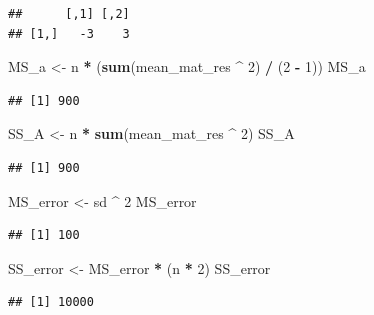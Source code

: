 \documentclass[
]{book}
\newenvironment{Shaded}{\begin{snugshade}}{\end{snugshade}}
\newcommand{\DecValTok}[1]{\textcolor[rgb]{0.00,0.00,0.81}{#1}}
\newcommand{\KeywordTok}[1]{\textcolor[rgb]{0.13,0.29,0.53}{\textbf{#1}}}
\newcommand{\NormalTok}[1]{#1}
\newcommand{\OperatorTok}[1]{\textcolor[rgb]{0.81,0.36,0.00}{\textbf{#1}}}
\newcommand{\StringTok}[1]{\textcolor[rgb]{0.31,0.60,0.02}{#1}}
\begin{document}
\begin{verbatim}
##      [,1] [,2]
## [1,]   -3    3
\end{verbatim}

\begin{Shaded}
\begin{Highlighting}[]
\NormalTok{MS_a <-}\StringTok{ }\NormalTok{n }\OperatorTok{*}\StringTok{ }\NormalTok{(}\KeywordTok{sum}\NormalTok{(mean_mat_res }\OperatorTok{^}\StringTok{ }\DecValTok{2}\NormalTok{) }\OperatorTok{/}\StringTok{ }\NormalTok{(}\DecValTok{2} \OperatorTok{-}\StringTok{ }\DecValTok{1}\NormalTok{))}
\NormalTok{MS_a}
\end{Highlighting}
\end{Shaded}

\begin{verbatim}
## [1] 900
\end{verbatim}

\begin{Shaded}
\begin{Highlighting}[]
\NormalTok{SS_A <-}\StringTok{ }\NormalTok{n }\OperatorTok{*}\StringTok{ }\KeywordTok{sum}\NormalTok{(mean_mat_res }\OperatorTok{^}\StringTok{ }\DecValTok{2}\NormalTok{)}
\NormalTok{SS_A}
\end{Highlighting}
\end{Shaded}

\begin{verbatim}
## [1] 900
\end{verbatim}

\begin{Shaded}
\begin{Highlighting}[]
\NormalTok{MS_error <-}\StringTok{ }\NormalTok{sd }\OperatorTok{^}\StringTok{ }\DecValTok{2}
\NormalTok{MS_error}
\end{Highlighting}
\end{Shaded}

\begin{verbatim}
## [1] 100
\end{verbatim}

\begin{Shaded}
\begin{Highlighting}[]
\NormalTok{SS_error <-}\StringTok{ }\NormalTok{MS_error }\OperatorTok{*}\StringTok{ }\NormalTok{(n }\OperatorTok{*}\StringTok{ }\DecValTok{2}\NormalTok{)}
\NormalTok{SS_error}
\end{Highlighting}
\end{Shaded}

\begin{verbatim}
## [1] 10000
\end{verbatim}
\end{document}
